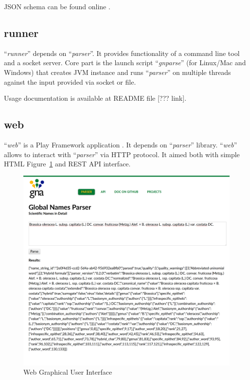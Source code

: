\documentclass{bmcart}
\begin{document}
JSON schema can be found online \cite{gnparser_json}.

\subsection*{runner}

``\textit{runner}'' depends on ``\textit{parser}''. It provides functionality
of a command line tool and a socket server. Core part is the launch script
``\textit{gnparse}'' (for Linux/Mac and Windows) that creates JVM
instance and runs ``\textit{parser}'' on multiple threads against the input
provided via socket or file.

Usage documentation is available at README file [??? link].

\subsection*{web}

``\textit{web}'' is a Play Framework application \cite{wampler2011scala}. It
depends on ``\textit{parser}'' library. ``\textit{web}'' allows to interact
with ``\textit{parser}'' via HTTP protocol. It aimed both with simple HTML
Figure~\ref{figure:webgui} and REST API interface.

\begin{figure}[htbp]
  \begin{center}
    \caption{
      Web Graphical User Interface
    }\label{figure:webgui}
    \vspace{5mm}

    \includegraphics[scale=0.175]{images/web_gui.png}
  \end{center}
\end{figure}
\end{document}

